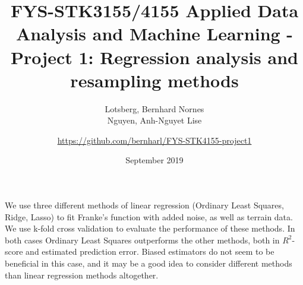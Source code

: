 \documentclass[a4paper, 10pt]{article}
\title{FYS-STK3155/4155 Applied Data Analysis and Machine Learning - Project 1: Regression analysis and resampling methods }
\author{Lotsberg, Bernhard Nornes \\ Nguyen, Anh-Nguyet Lise \and \url{https://github.com/bernharl/FYS-STK4155-project1}}
\date{September 2019}
\renewenvironment{abstract}
 {\small
  \begin{center}
  \bfseries \abstractname\vspace{-.5em}\vspace{0pt}
  \end{center}
  \list{}{%
    \setlength{\leftmargin}{2.5 cm}%
    \setlength{\rightmargin}{\leftmargin}%
  }%
  \item\relax}
 {\endlist}
\begin{document}
\maketitle


\begin{abstract} \noindent
    We use three different methods of linear regression (Ordinary Least Squares, Ridge, Lasso) to fit Franke's function with added noise, as well as terrain data. We use k-fold cross validation to evaluate the performance of these methods. In both cases Ordinary Least Squares outperforms the other methods, both in $R^2$-score and estimated prediction error. Biased estimators do not seem to be beneficial in this case, and it may be a good idea to consider different methods than linear regression methods altogether.
\end{abstract}
\end{document}
